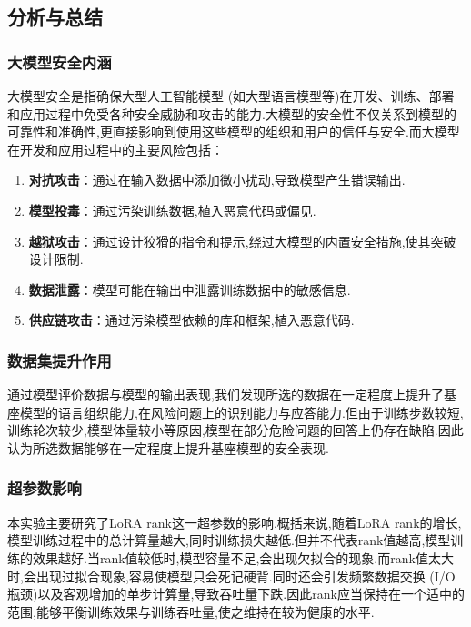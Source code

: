 \documentclass[12pt]{ctexart}
\begin{document}
\subsection{分析与总结}

\subsubsection{大模型安全内涵}

大模型安全是指确保大型人工智能模型 (如大型语言模型等)在开发、训练、部署和应用过程中免受各种安全威胁和攻击的能力.大模型的安全性不仅关系到模型的可靠性和准确性,更直接影响到使用这些模型的组织和用户的信任与安全.而大模型在开发和应用过程中的主要风险包括：

\begin{enumerate}

    \item \textbf{对抗攻击}：通过在输入数据中添加微小扰动,导致模型产生错误输出.

    \item \textbf{模型投毒}：通过污染训练数据,植入恶意代码或偏见.

    \item \textbf{越狱攻击}：通过设计狡猾的指令和提示,绕过大模型的内置安全措施,使其突破设计限制.

    \item \textbf{数据泄露}：模型可能在输出中泄露训练数据中的敏感信息.

    \item \textbf{供应链攻击}：通过污染模型依赖的库和框架,植入恶意代码.

\end{enumerate}

\subsubsection{数据集提升作用}

通过模型评价数据与模型的输出表现,我们发现所选的数据在一定程度上提升了基座模型的语言组织能力,在风险问题上的识别能力与应答能力.但由于训练步数较短,训练轮次较少,模型体量较小等原因,模型在部分危险问题的回答上仍存在缺陷.因此认为所选数据能够在一定程度上提升基座模型的安全表现.

\subsubsection{超参数影响}

本实验主要研究了LoRA rank这一超参数的影响.概括来说,随着LoRA rank的增长,模型训练过程中的总计算量越大,同时训练损失越低.但并不代表rank值越高,模型训练的效果越好.当rank值较低时,模型容量不足,会出现欠拟合的现象.而rank值太大时,会出现过拟合现象,容易使模型只会死记硬背.同时还会引发频繁数据交换 (I/O瓶颈)以及客观增加的单步计算量,导致吞吐量下跌.因此rank应当保持在一个适中的范围,能够平衡训练效果与训练吞吐量,使之维持在较为健康的水平.
\end{document}
